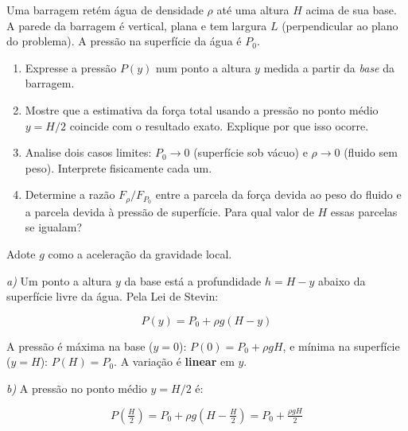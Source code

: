 \begin{exemplo}\label{exemplo_fluidos_stevinex03}


Uma barragem retém água de densidade $\rho$ até uma altura $H$ acima
de sua base. A parede da barragem é vertical, plana e tem largura $L$
(perpendicular ao plano do problema). A pressão na superfície da água
é $P_0$.
 
\begin{enumerate}
    \item [a)] Expresse a pressão $P(y)$ num
          ponto a altura $y$ medida a partir da \textit{base} da
          barragem.
    \item [b)] Mostre que a estimativa da força total usando a pressão no
          ponto médio $y = H/2$ coincide com o resultado exato.
          Explique por que isso ocorre.
    \item [c)]  Analise dois casos limites: $P_0 \to 0$ (superfície sob
          vácuo) e $\rho \to 0$ (fluido sem peso). Interprete
          fisicamente cada um.
    \item [d)] Determine a razão $F_{\rho}/F_{P_0}$ entre a parcela da
          força devida ao peso do fluido e a parcela devida à pressão
          de superfície. Para qual valor de $H$ essas parcelas se
          igualam?
\end{enumerate}
 
Adote $g$ como a aceleração da gravidade local.
 

\resolucao



\textit{a)} Um ponto a altura $y$ da base está a profundidade
$h = H - y$ abaixo da superfície livre da água. Pela Lei de Stevin:
 
\begin{equation}
    \boxed{P(y) = P_0 + \rho g (H - y)}
    \label{eq:pressao_parede}
\end{equation}
 
A pressão é máxima na base ($y = 0$):
$P(0) = P_0 + \rho g H$, e mínima na superfície ($y = H$):
$P(H) = P_0$. A variação é \textbf{linear} em $y$.

\medskip
 
\textit{b)} A pressão no ponto médio $y = H/2$ é:
 
\begin{equation*}
    P\!\left(\tfrac{H}{2}\right)
    = P_0 + \rho g\!\left(H - \tfrac{H}{2}\right)
    = P_0 + \tfrac{\rho g H}{2}
\end{equation*}
 

\end{exemplo}
